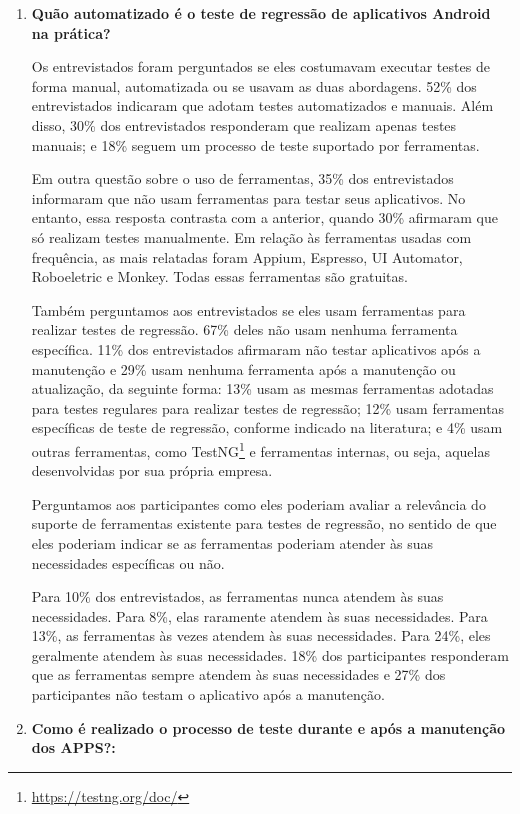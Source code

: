 \begin{enumerate}[label=\bf QP\arabic*]
    
\item \textbf{Quão automatizado é o teste de regressão de aplicativos Android na prática?}
    
Os entrevistados foram perguntados se eles costumavam executar testes de forma manual, automatizada ou se usavam as duas abordagens. 52\% dos entrevistados indicaram que adotam testes automatizados e manuais. Além disso, 30\% dos entrevistados responderam que realizam apenas testes manuais; e 18\% seguem um processo de teste suportado por ferramentas.
 
Em outra questão sobre o uso de ferramentas, 35\% dos entrevistados informaram que não usam ferramentas para testar seus aplicativos. No entanto, essa resposta contrasta com a anterior, quando 30\% afirmaram que só realizam testes manualmente. Em relação às ferramentas usadas com frequência, as mais relatadas foram Appium, Espresso, UI Automator, Roboeletric e Monkey. Todas essas ferramentas são gratuitas.
 
Também perguntamos aos entrevistados se eles usam ferramentas para realizar testes de regressão. 67\% deles não usam nenhuma ferramenta específica. 11\% dos entrevistados afirmaram não testar aplicativos após a manutenção e 29\% usam nenhuma ferramenta após a manutenção ou atualização, da seguinte forma: 13\% usam as mesmas ferramentas adotadas para testes regulares para realizar testes de regressão; 12\% usam ferramentas específicas de teste de regressão, conforme indicado na literatura; e 4\% usam outras ferramentas, como TestNG\footnote{\url{https://testng.org/doc/}} e ferramentas internas, ou seja, aquelas desenvolvidas por sua própria empresa.

Perguntamos aos participantes como eles poderiam avaliar a relevância do suporte de ferramentas existente para testes de regressão, no sentido de que eles poderiam indicar se as ferramentas poderiam atender às suas necessidades específicas ou não.

Para 10\% dos entrevistados, as ferramentas nunca atendem às suas necessidades. Para 8\%, elas raramente atendem às suas necessidades. Para 13\%, as ferramentas às vezes atendem às suas necessidades. Para 24\%, eles geralmente atendem às suas necessidades. 18\% dos participantes responderam que as ferramentas sempre atendem às suas necessidades e 27\% dos participantes não testam o aplicativo após a manutenção.
    
\item \textbf{Como é realizado o processo de teste durante e após a manutenção dos \ac{APPS}?:}


\end{enumerate}
